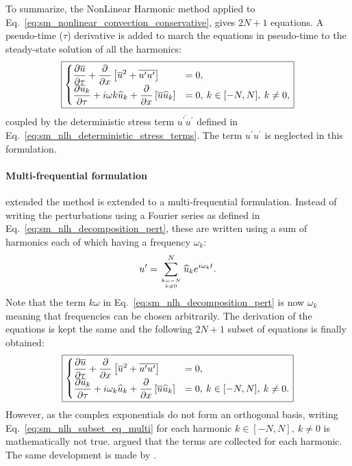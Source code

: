 To summarize, the NonLinear Harmonic
method applied to Eq.~\ref{eq:sm_nonlinear_convection_conservative},
gives $2N + 1$ equations. A pseudo-time ($\tau$) derivative is
added to march the equations in pseudo-time to the steady-state 
solution of all the harmonics:
\begin{equation}
	\fbox{$
	\begin{cases}
		\displaystyle \frac{\partial \overline{u}}{\partial \tau} + 
		\frac{\partial}{\partial x}
			\left[\overline{u}^2 + 
			\overline{u^\prime u^\prime}\right] &=
			0, \\
		\displaystyle \frac{\partial \widehat{u}_k}{\partial \tau} + 
		i \omega k \widehat{u}_k + 
			\frac{\partial}{\partial x} 
			\left[ \overline{u} \widehat{u}_k\right] &= 
			0, \: k \in [-N, N], \: k \neq 0,
	\end{cases}
	$}
	\label{eq:sm_nlh_subset_eq}
\end{equation}
coupled by the deterministic stress term $\overline{u^\prime u^\prime}$
defined in Eq.~\ref{eq:sm_nlh_deterministic_stress_terms}.
The term $u^\prime u^\prime$ is neglected in this formulation.

\paragraph{Multi-frequential formulation}

\citet{He2002} extended the method is extended to a multi-frequential
formulation. Instead of writing the perturbations
using a Fourier series as defined in Eq.~\ref{eq:sm_nlh_decomposition_pert},
these are written using a sum of harmonics each of which
having a frequency $\omega_k$:
\begin{equation}
	u^\prime = \sum_{k=-N \atop k \neq 0}^{N} 
	\widehat{u}_k e^{i \omega_k t}.
	\label{eq:sm_nlh_decomposition_pert_multi}
\end{equation}
Note that the term $k \omega$ in Eq.~\ref{eq:sm_nlh_decomposition_pert}
is now $\omega_k$ meaning that frequencies can be chosen
arbitrarily.
The derivation of the equations is kept the same and the following
$2N+1$ subset of equations is finally obtained:
\begin{equation}
	\fbox{$
	\begin{cases}
		\displaystyle
		\frac{\partial \overline{u}}{\partial \tau} +
		\frac{\partial}{\partial x}
			\left[\overline{u}^2 + 
			\overline{u^\prime u^\prime}\right] &=
			0, \\
		\displaystyle
		\frac{\partial \widehat{u}_k}{\partial \tau} + 
		i \omega_k \widehat{u}_k + 
			\frac{\partial}{\partial x} 
			\left[ \overline{u} \widehat{u}_k\right] &= 
			0, \: k \in [-N, N], \: k \neq 0.
	\end{cases}
	$}
	\label{eq:sm_nlh_subset_eq_multi}
\end{equation}
However, as the complex exponentials do not form
an orthogonal basis, writing Eq.~\ref{eq:sm_nlh_subset_eq_multi}
for each harmonic $k \in [-N, N], \: k \neq 0$ is mathematically
not true. \citet{He2002} argued that the terms
are collected for each harmonic. 
The same development is made by \citet{Vilmin2006}.

